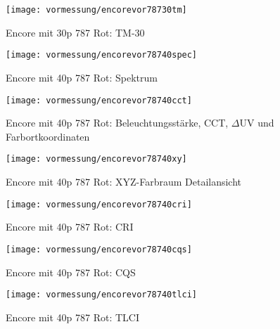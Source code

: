\documentclass[pagesize,paper=A4,fontsize=12pt,utf8,numbers=noenddot,bibliography=totoc,listof=totoc,DIV=11,BCOR=1mm]{scrreprt}
\begin{document}
\begin{figure}[htp]     %
\centering
\texttt{[image: vormessung/encorevor78730tm]} 
\caption {Encore mit 30p 787 Rot: TM-30} 
\end{figure}



\begin{figure}[htp]     %
\centering
\texttt{[image: vormessung/encorevor78740spec]} 
\caption {Encore mit 40p 787 Rot: Spektrum} 
\end{figure}

\begin{figure}[htp]     %
\centering
\texttt{[image: vormessung/encorevor78740cct]} 
\caption {Encore mit 40p 787 Rot: Beleuchtungsstärke, CCT, $\Delta$UV und Farbortkoordinaten} 
\end{figure}

\begin{figure}[htp]     %
\centering
\texttt{[image: vormessung/encorevor78740xy]} 
\caption {Encore mit 40p 787 Rot: XYZ-Farbraum Detailansicht} 
\end{figure}

\begin{figure}[htp]     %
\centering
\texttt{[image: vormessung/encorevor78740cri]} 
\caption {Encore mit 40p 787 Rot: CRI} 
\end{figure}

\begin{figure}[htp]     %
\centering
\texttt{[image: vormessung/encorevor78740cqs]} 
\caption {Encore mit 40p 787 Rot: CQS} 
\end{figure}

\begin{figure}[htp]     %
\centering
\texttt{[image: vormessung/encorevor78740tlci]} 
\caption {Encore mit 40p 787 Rot: TLCI} 
\end{figure}
\end{document}
